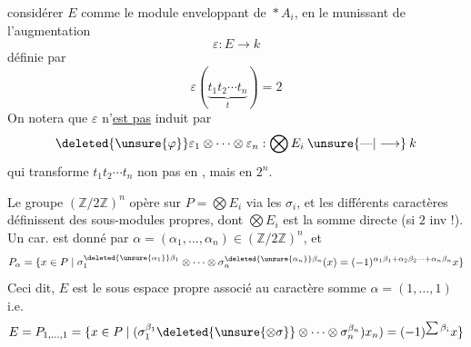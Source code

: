considérer $E$ comme le module enveloppant de $\mathop{\ast}A_i$, en le munissant de l'augmentation
\[
 \varepsilon:E\longrightarrow k
\]
définie par
\[
 \varepsilon(\underbrace{t_1t_2\cdots t_n}_{t})=2
\]
On notera que $\varepsilon$ n'\uline{est pas} induit par
\[
 \deleted{\unsure{\varphi}}\varepsilon_1\otimes\cdots\otimes\varepsilon_n:\bigotimes E_i\mathbin{\unsure{\text{---}|\longrightarrow}}k
\]
qui transforme $t_1t_2\cdots t_n$ non pas en , mais en $2^n$.

Le groupe $(\mathbb Z/2\mathbb Z)^n$ opère sur $P=\bigotimes E_i$ via les $\sigma_i$, et les différents caractères définissent des sous-modules propres, dont $\bigotimes E_i$ est la somme directe (si $2$ inv !). Un car. est donné par $\alpha=(\alpha_1,\ldots,\alpha_n)\in(\mathbb Z/2\mathbb Z)^n$, et 
\[
 P_\alpha=\{x\in P\mid \sigma_1^{\deleted{\unsure{\alpha_1}}\beta_1}\otimes\cdots\otimes\sigma_n^{\deleted{\unsure{\alpha_n}}\beta_n}(x)=(-1)^{\alpha_1\beta_1+\alpha_2\beta_2\cdots+\alpha_n\beta_n}x\}
\]
Ceci dit, $E$ est le sous espace propre associé au caractère somme $\alpha=(1,\ldots,1)$ i.e.
\[
 E=P_{1,\ldots,1}=\{x\in P\mid(\sigma_1^{\beta_1}\deleted{\unsure{\otimes\sigma}}\otimes\cdots\otimes\sigma_n^{\beta_n})x_n)=(-1)^{\sum\beta_i}x\}
\]

